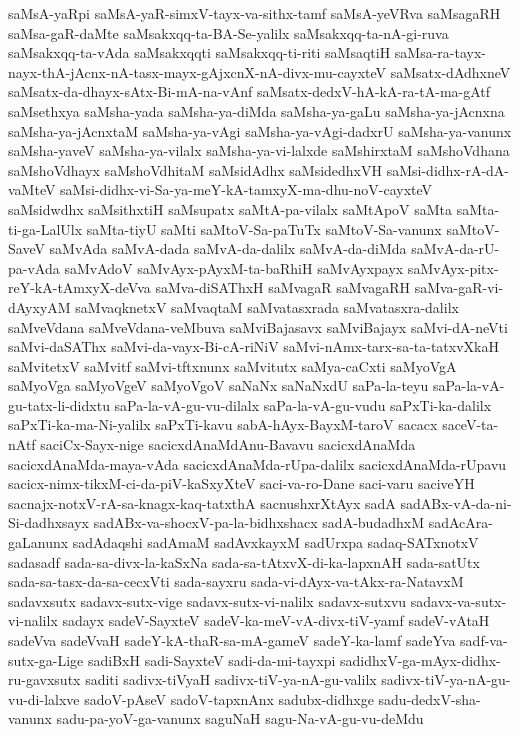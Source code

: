 {saMsA-yaRpi
saMsA-yaR-simxV-tayx-va-sithx-tamf
saMsA-yeVRva
saMsagaRH
saMsa-gaR-daMte
saMsakxqq-ta-BA-Se-yalilx
saMsakxqq-ta-nA-gi-ruva
saMsakxqq-ta-vAda
saMsakxqqti
saMsakxqq-ti-riti
saMsaqtiH
saMsa-ra-tayx-nayx-thA-jAcnx-nA-tasx-mayx-gAjxcnX-nA-divx-mu-cayxteV
saMsatx-dAdhxneV
saMsatx-da-dhayx-sAtx-Bi-mA-na-vAnf
saMsatx-dedxV-hA-kA-ra-tA-ma-gAtf
saMsethxya
saMsha-yada
saMsha-ya-diMda
saMsha-ya-gaLu
saMsha-ya-jAcnxna
saMsha-ya-jAcnxtaM
saMsha-ya-vAgi
saMsha-ya-vAgi-dadxrU
saMsha-ya-vanunx
saMsha-yaveV
saMsha-ya-vilalx
saMsha-ya-vi-lalxde
saMshirxtaM
saMshoVdhana
saMshoVdhayx
saMshoVdhitaM
saMsidAdhx
saMsidedhxVH
saMsi-didhx-rA-dA-vaMteV
saMsi-didhx-vi-Sa-ya-meY-kA-tamxyX-ma-dhu-noV-cayxteV
saMsidwdhx
saMsithxtiH
saMsupatx
saMtA-pa-vilalx
saMtApoV
saMta
saMta-ti-ga-LalUlx
saMta-tiyU
saMti
saMtoV-Sa-paTuTx
saMtoV-Sa-vanunx
saMtoV-SaveV
saMvAda
saMvA-dada
saMvA-da-dalilx
saMvA-da-diMda
saMvA-da-rU-pa-vAda
saMvAdoV
saMvAyx-pAyxM-ta-baRhiH
saMvAyxpayx
saMvAyx-pitx-reY-kA-tAmxyX-deVva
saMva-diSAThxH
saMvagaR
saMvagaRH
saMva-gaR-vi-dAyxyAM
saMvaqknetxV
saMvaqtaM
saMvatasxrada
saMvatasxra-dalilx
saMveVdana
saMveVdana-veMbuva
saMviBajasavx
saMviBajayx
saMvi-dA-neVti
saMvi-daSAThx
saMvi-da-vayx-Bi-cA-riNiV
saMvi-nAmx-tarx-sa-ta-tatxvXkaH
saMvitetxV
saMvitf
saMvi-tftxnunx
saMvitutx
saMya-caCxti
saMyoVgA
saMyoVga
saMyoVgeV
saMyoVgoV
saNaNx
saNaNxdU
saPa-la-teyu
saPa-la-vA-gu-tatx-li-didxtu
saPa-la-vA-gu-vu-dilalx
saPa-la-vA-gu-vudu
saPxTi-ka-dalilx
saPxTi-ka-ma-Ni-yalilx
saPxTi-kavu
sabA-hAyx-BayxM-taroV
sacacx
saceV-ta-nAtf
saciCx-Sayx-nige
sacicxdAnaMdAnu-Bavavu
sacicxdAnaMda
sacicxdAnaMda-maya-vAda
sacicxdAnaMda-rUpa-dalilx
sacicxdAnaMda-rUpavu
sacicx-nimx-tikxM-ci-da-piV-kaSxyXteV
saci-va-ro-Dane
saci-varu
saciveYH
sacnajx-notxV-rA-sa-knagx-kaq-tatxthA
sacnushxrXtAyx
sadA
sadABx-vA-da-ni-Si-dadhxsayx
sadABx-va-shocxV-pa-la-bidhxshacx
sadA-budadhxM
sadAcAra-gaLanunx
sadAdaqshi
sadAmaM
sadAvxkayxM
sadUrxpa
sadaq-SATxnotxV
sadasadf
sada-sa-divx-la-kaSxNa
sada-sa-tAtxvX-di-ka-lapxnAH
sada-satUtx
sada-sa-tasx-da-sa-cecxVti
sada-sayxru
sada-vi-dAyx-va-tAkx-ra-NatavxM
sadavxsutx
sadavx-sutx-vige
sadavx-sutx-vi-nalilx
sadavx-sutxvu
sadavx-va-sutx-vi-nalilx
sadayx
sadeV-SayxteV
sadeV-ka-meV-vA-divx-tiV-yamf
sadeV-vAtaH
sadeVva
sadeVvaH
sadeY-kA-thaR-sa-mA-gameV
sadeY-ka-lamf
sadeYva
sadf-va-sutx-ga-Lige
sadiBxH
sadi-SayxteV
sadi-da-mi-tayxpi
sadidhxV-ga-mAyx-didhx-ru-gavxsutx
saditi
sadivx-tiVyaH
sadivx-tiV-ya-nA-gu-valilx
sadivx-tiV-ya-nA-gu-vu-di-lalxve
sadoV-pAseV
sadoV-tapxnAnx
sadubx-didhxge
sadu-dedxV-sha-vanunx
sadu-pa-yoV-ga-vanunx
saguNaH
sagu-Na-vA-gu-vu-deMdu
}
